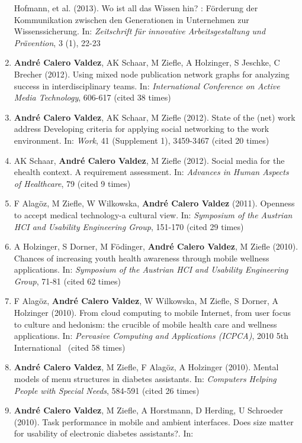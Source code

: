 \documentclass[11pt,a4paper,sans]{moderncv}
\begin{document}
\begin{enumerate}
  Hofmann, et al. (2013). Wo ist all das Wissen hin? : Förderung der
  Kommunikation zwischen den Generationen in Unternehmen zur
  Wissenssicherung. In: \emph{Zeitschrift für innovative
  Arbeitsgestaltung und Prävention}, 3 (1), 22-23
\item
  \textbf{André Calero Valdez}, AK Schaar, M Ziefle, A Holzinger, S
  Jeschke, C Brecher (2012). Using mixed node publication network graphs
  for analyzing success in interdisciplinary teams. In:
  \emph{International Conference on Active Media Technology}, 606-617
  (cited 38 times)
\item
  \textbf{André Calero Valdez}, AK Schaar, M Ziefle (2012). State of the
  (net) work address Developing criteria for applying social networking
  to the work environment. In: \emph{Work}, 41 (Supplement 1), 3459-3467
  (cited 20 times)
\item
  AK Schaar, \textbf{André Calero Valdez}, M Ziefle (2012). Social media
  for the ehealth context. A requirement assessment. In: \emph{Advances
  in Human Aspects of Healthcare}, 79 (cited 9 times)
\item
  F Alagöz, M Ziefle, W Wilkowska, \textbf{André Calero Valdez} (2011).
  Openness to accept medical technology-a cultural view. In:
  \emph{Symposium of the Austrian HCI and Usability Engineering Group},
  151-170 (cited 29 times)
\item
  A Holzinger, S Dorner, M Födinger, \textbf{André Calero Valdez}, M
  Ziefle (2010). Chances of increasing youth health awareness through
  mobile wellness applications. In: \emph{Symposium of the Austrian HCI
  and Usability Engineering Group}, 71-81 (cited 62 times)
\item
  F Alagöz, \textbf{André Calero Valdez}, W Wilkowska, M Ziefle, S
  Dorner, A Holzinger (2010). From cloud computing to mobile Internet,
  from user focus to culture and hedonism: the crucible of mobile health
  care and wellness applications. In: \emph{Pervasive Computing and
  Applications (ICPCA)}, 2010 5th International~ (cited 58 times)
\item
  \textbf{André Calero Valdez}, M Ziefle, F Alagöz, A Holzinger (2010).
  Mental models of menu structures in diabetes assistants. In:
  \emph{Computers Helping People with Special Needs}, 584-591 (cited 26
  times)
\item
  \textbf{André Calero Valdez}, M Ziefle, A Horstmann, D Herding, U
  Schroeder (2010). Task performance in mobile and ambient interfaces.
  Does size matter for usability of electronic diabetes assistants?. In:

\end{enumerate}
\end{document}
